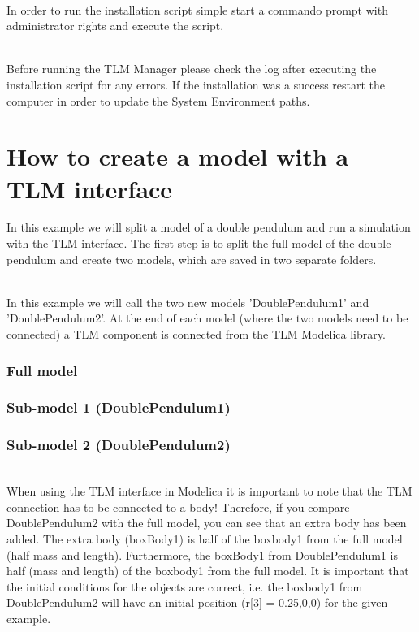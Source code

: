 ~\\In order to run the installation script simple start a commando prompt with administrator rights and execute the script.

~\\Before running the TLM Manager please check the log after executing the installation script for any errors. 
If the installation was a success restart the computer in order to update the System Environment paths.

\section{How to create a model with a TLM interface}
In this example we will split a model of a double pendulum and run a simulation with the TLM interface. 
The first step is to split the full model of the double pendulum and create two models, which are saved in two separate folders.


~\\In this example we will call the two new models 'DoublePendulum1' and 'DoublePendulum2'. 
At the end of each model (where the two models need to be connected) a TLM component is connected from the TLM Modelica library.

\subsubsection{Full model}

\subsubsection{Sub-model 1 (DoublePendulum1)}


\subsubsection{Sub-model 2 (DoublePendulum2)}

~\\When using the TLM interface in Modelica it is important to note that the TLM connection has to be connected to a body! Therefore, if you compare DoublePendulum2 with the full model, you can see that an extra body has been added. 
The extra body (boxBody1) is half of the boxbody1 from the full model (half mass and length). 
Furthermore, the boxBody1 from DoublePendulum1 is half (mass and length) of the boxbody1 from the full model.
It is important that the initial conditions for the objects are correct, i.e. the boxbody1 from DoublePendulum2 will have an initial position (r[3] = {0.25,0,0})  for the given example.

